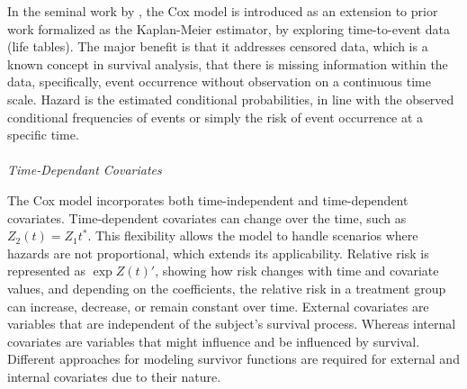 \noindent In the seminal work by \parencite{cox_regression_1972}, the Cox model is introduced as an extension to prior work formalized as the Kaplan-Meier estimator, by exploring time-to-event data (life tables). The major benefit is that it addresses censored data, which is a known concept in survival analysis, that there is missing information within the data, specifically, event occurrence without observation on a continuous time scale. Hazard is the estimated conditional probabilities, in line with the observed conditional frequencies of events or simply the risk of event occurrence at a specific time.
\\\\
\textit{Time-Dependant Covariates}
\par \noindent The Cox model incorporates both time-independent and time-dependent covariates. \parencite{kalbfleisch_fifty_2023} Time-dependent covariates can change over the time, such as \(Z_{2}(t) = Z_{1}t^{*}\). This flexibility allows the model to handle scenarios where hazards are not proportional, which extends its applicability. Relative risk is represented as \(\exp{Z(t)'}\), showing how risk changes with time and covariate values, and depending on the coefficients, the relative risk in a treatment group can increase, decrease, or remain constant over time. \parencite{kalbfleisch_fifty_2023} External covariates are variables that are independent of the subject's survival process. Whereas internal covariates are variables that might influence and be influenced by survival. \parencite{kalbfleisch_fifty_2023} Different approaches for modeling survivor functions are required for external and internal covariates due to their nature.
\\\\
